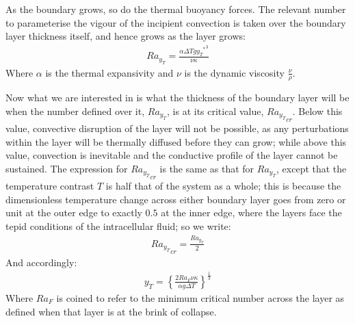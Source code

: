 \documentclass[letterpaper,10pt,english]{jupyterBook}
\begin{document}
\sphinxAtStartPar
As the boundary grows, so do the thermal buoyancy forces. The relevant  number to parameterise the vigour of the incipient convection is taken over the boundary layer thickness itself, and hence grows as the layer grows:
\begin{equation*}
\begin{split} Ra_{y_T} = \frac{\alpha \Delta T g {{y_T}^*}^3}{\nu \kappa} \end{split}
\end{equation*}
\sphinxAtStartPar
Where \(\alpha\) is the thermal expansivity and \(\nu\) is the dynamic viscosity \(\frac{\nu}{\rho}\).

\sphinxAtStartPar
Now what we are interested in is what the thickness of the boundary layer will be when the  number defined over it, \(Ra_{y_T}\), is at its critical value, \({Ra_{y_T}}_{cr}\). Below this value, convective disruption of the layer will not be possible, as any perturbations within the layer will be thermally diffused before they can grow; while above this value, convection is inevitable and the conductive profile of the layer cannot be sustained. The expression for \({Ra_{y_T}}_{cr}\) is the same as that for \(Ra_{y_T}\), except that the temperature contrast \(T\) is half that of the system as a whole; this is because the dimensionless temperature change across either boundary layer goes from zero or unit at the outer edge to exactly \(0.5\) at the inner edge, where the layers face the tepid conditions of the intracellular fluid; so we write:
\begin{equation*}
\begin{split} {Ra_{y_T}}_{cr} = \frac{Ra_{y_T}}{2} \end{split}
\end{equation*}
\sphinxAtStartPar
And accordingly:
\begin{equation*}
\begin{split} y_T = \left\{ \frac{2 Ra_F \nu \kappa}{\alpha g \Delta T} \right\} ^{\frac{1}{3}} \end{split}
\end{equation*}
\sphinxAtStartPar
Where \(Ra_F\) is coined to refer to the minimum critical  number across the layer as defined when that layer is at the brink of collapse.
\end{document}
